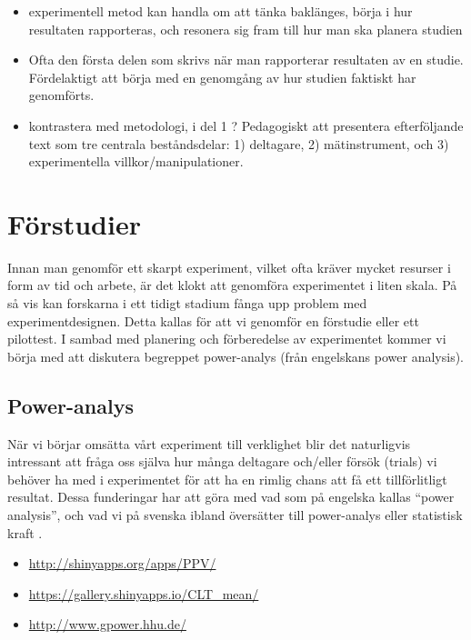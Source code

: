 \documentclass[
]{book}
\providecommand{\tightlist}{%
  \setlength{\itemsep}{0pt}\setlength{\parskip}{0pt}}
\begin{document}
\begin{itemize}
\item
  experimentell metod kan handla om att tänka baklänges, börja i hur resultaten rapporteras, och resonera sig fram till hur man ska planera studien
\item
  Ofta den första delen som skrivs när man rapporterar resultaten av en studie. Fördelaktigt att börja med en genomgång av hur studien faktiskt har genomförts.
\item
  kontrastera med metodologi, i del 1 ? Pedagogiskt att presentera efterföljande text som tre centrala beståndsdelar: 1) deltagare, 2) mätinstrument, och 3) experimentella villkor/manipulationer.
\end{itemize}

\hypertarget{sec07.1}{%
\section{Förstudier}\label{sec07.1}}

Innan man genomför ett skarpt experiment, vilket ofta kräver mycket resurser i form av tid och arbete, är det klokt att genomföra experimentet i liten skala. På så vis kan forskarna i ett tidigt stadium fånga upp problem med experimentdesignen. Detta kallas för att vi genomför en förstudie eller ett pilottest. I sambad med planering och förberedelse av experimentet kommer vi börja med att diskutera begreppet power-analys (från engelskans power analysis).

\hypertarget{sub07.1.1}{%
\subsection{Power-analys}\label{sub07.1.1}}

När vi börjar omsätta vårt experiment till verklighet blir det naturligvis intressant att fråga oss själva hur många deltagare och/eller försök (trials) vi behöver ha med i experimentet för att ha en rimlig chans att få ett tillförlitligt resultat. Dessa funderingar har att göra med vad som på engelska kallas ``power analysis'', och vad vi på svenska ibland översätter till power-analys eller statistisk kraft \citep{ellis2010essential, sullivan2012using, cumming2013understanding}.

\begin{itemize}
\tightlist
\item
  \url{http://shinyapps.org/apps/PPV/}
\item
  \url{https://gallery.shinyapps.io/CLT_mean/}
\item
  \url{http://www.gpower.hhu.de/}
\end{itemize}
\end{document}
